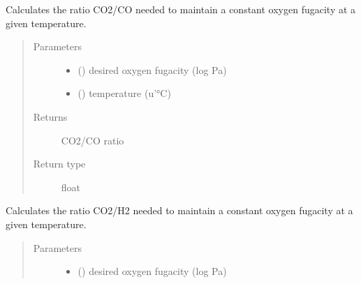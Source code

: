 \documentclass[letterpaper,10pt,english]{sphinxmanual}
\begin{document}
\begin{fulllineitems}
\begin{fulllineitems}
\end{fulllineitems}


\begin{fulllineitems}
\label{\detokenize{drivers:drivers.MFC.fugacity_co}}
Calculates the ratio CO2/CO needed to maintain a constant oxygen fugacity at a given temperature.
\begin{quote}\begin{description}
\item[{Parameters}] \leavevmode\begin{itemize}
\item {} 
 (\sphinxstyleliteralemphasis{\sphinxupquote{, }}) \textendash{} desired oxygen fugacity (log Pa)

\item {} 
 (\sphinxstyleliteralemphasis{\sphinxupquote{, }}) \textendash{} temperature (u’°C)

\end{itemize}

\item[{Returns}] \leavevmode
CO2/CO ratio

\item[{Return type}] \leavevmode
float

\end{description}\end{quote}

\end{fulllineitems}


\begin{fulllineitems}
\label{\detokenize{drivers:drivers.MFC.fugacity_h2}}
Calculates the ratio CO2/H2 needed to maintain a constant oxygen fugacity at a given temperature.
\begin{quote}\begin{description}
\item[{Parameters}] \leavevmode\begin{itemize}
\item {} 
 (\sphinxstyleliteralemphasis{\sphinxupquote{, }}) \textendash{} desired oxygen fugacity (log Pa)


\end{itemize}
\end{description}
\end{quote}
\end{fulllineitems}
\end{fulllineitems}
\end{document}
